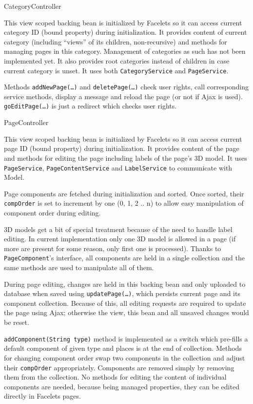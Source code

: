 \secc CategoryController

This view scoped backing bean is initialized by Facelets so it can access current category ID (bound property) during initialization. It provides content of current category (including “views” of its children, non-recursive) and methods for managing pages in this category. Management of categories as such has not been implemented yet. It also provides root categories instead of children in case current category is unset. It uses both {\tt CategoryService} and {\tt PageService}.

Methods {\tt addNewPage(…)} and {\tt deletePage(…)} check user rights, call corresponding service methods, display a message and reload the page (or not if Ajax is used). {\tt goEditPage(…)} is just a redirect which checks user rights.

\secc PageController

This view scoped backing bean is initialized by Facelets so it can access current page ID (bound property) during initialization. It provides content of the page and methods for editing the page including labels of the page’s 3D model. It uses {\tt PageService}, {\tt PageContentService} and {\tt LabelService} to communicate with Model.

Page components are fetched during initialization and sorted. Once sorted, their {\tt compOrder} is set to increment by one (0, 1, 2 .. n) to allow easy manipulation of component order during editing.

3D models get a bit of special treatment because of the need to handle label editing. In current implementation only one 3D model is allowed in a page (if more are present for some reason, only first one is processed).  Thanks to {\tt PageComponent}’s interface, all components are held in a single collection and the same methods are used to manipulate all of them.

During page editing, changes are held in this backing bean and only uploaded to database when saved using {\tt updatePage(…)}, which persists current page and its component collection. Because of this, all editing requests are required to update the page using Ajax; otherwise the view, this bean and all unsaved changes would be reset.

{\tt addComponent(String type)} method is implemented as a switch which pre-fills a default component of given type and places is at the end of collection. Methods for changing component order swap two components in the collection and adjust their {\tt compOrder} appropriately. Components are removed simply by removing them from the collection. No methods for editing the content of individual components are needed, because being managed properties, they can be edited directly in Facelets pages.

